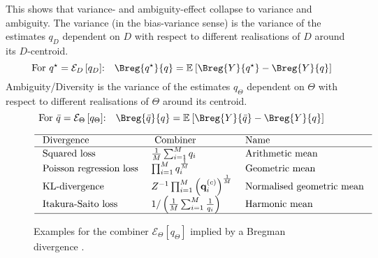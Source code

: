 \documentclass[../main.tex]{subfiles}
\begin{document}

This shows that variance- and ambiguity-effect collapse to variance and ambiguity. The variance (in the bias-variance sense) is the variance of the estimates $q_D$ dependent on $D$ with respect to different realisations of $D$ around its $D$-centroid. 
$$
\text{For $q^\star = \mathcal{E}_D\left[q_D\right]$:}\hspace{1em}
\Breg{q^\star}{q} = \mathbb{E}_{}\left[ \Breg{Y}{q^\star} - \Breg{Y}{q} \right]
$$
Ambiguity/Diversity is the variance of the estimates $q_\Theta$ dependent on $\Theta$ with respect to different realisations of $\Theta$ around its centroid.
$$
\text{For $\bar{q} = \mathcal{E}_\Theta\left[q_\Theta\right]$:}\hspace{1em}
\Breg{\bar{q}}{q} = \mathbb{E}_{}\left[ \Breg{Y}{\bar{q}} - \Breg{Y}{q} \right]
$$

\begin{figure}
$$
\begin{array}{lll}
\hline \text { Divergence } & \text { Combiner } & \text { Name } \\
\hline \text { Squared loss } & \frac{1}{M} \sum_{i=1}^M q_i & \text { Arithmetic mean } \\
\text { Poisson regression loss } & \prod_{i=1}^M q_i^{\frac{1}{M}} & \text { Geometric mean } \\
\text { KL-divergence } & Z^{-1} \prod_{i=1}^M\left(\mathbf{q}_i^{(c)}\right)^{\frac{1}{M}} & \text { Normalised geometric mean } \\
\text { Itakura-Saito loss } & 1 /\left(\frac{1}{M} \sum_{i=1}^M \frac{1}{q_i}\right) & \text { Harmonic mean } \\
\hline
\end{array}
$$
\caption{Examples for the combiner $\mathcal{E}_\Theta \left[q_\Theta\right]$ implied by a Bregman divergence \cite{wood_UnifiedTheoryDiversity_2023}.}
\end{figure}

\end{document}
